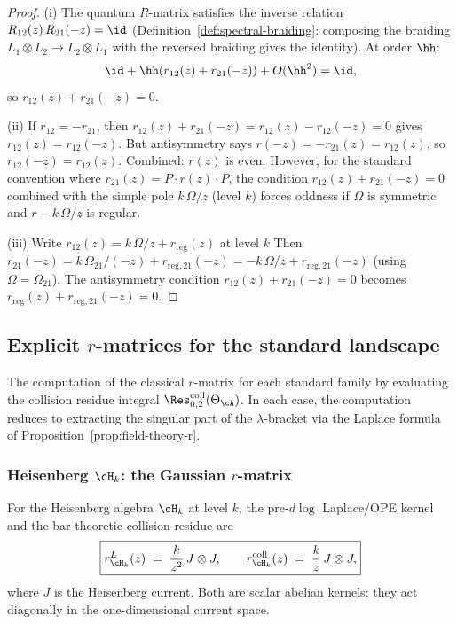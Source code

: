 \begin{proof}
(i) The quantum $R$-matrix satisfies the inverse relation
$R_{12}(z)\, R_{21}(-z) = \id$ (Definition~\ref{def:spectral-braiding}:
composing the braiding $L_1 \otimes L_2 \to L_2 \otimes L_1$
with the reversed braiding gives the identity). At order $\hh$:
\[
\id + \hh(r_{12}(z) + r_{21}(-z)) + O(\hh^2) = \id,
\]
so $r_{12}(z) + r_{21}(-z) = 0$.

(ii) If $r_{12} = -r_{21}$, then
$r_{12}(z) + r_{21}(-z) = r_{12}(z) - r_{12}(-z) = 0$ gives
$r_{12}(z) = r_{12}(-z)$. But antisymmetry says $r(-z) = -r_{21}(z)
= r_{12}(z)$, so $r_{12}(-z) = r_{12}(z)$. Combined: $r(z)$ is
even. However, for the standard convention where
$r_{21}(z) = P \cdot r(z) \cdot P$, the condition
$r_{12}(z) + r_{21}(-z) = 0$ combined with the simple pole
$k\,\Omega/z$ (level $k$) forces oddness if $\Omega$ is symmetric and
$r - k\,\Omega/z$ is regular.

(iii) Write $r_{12}(z) = k\,\Omega/z + r_{\mathrm{reg}}(z)$
at level $k$ Then $r_{21}(-z) = k\,\Omega_{21}/(-z) + r_{\mathrm{reg},21}(-z)
= -k\,\Omega/z + r_{\mathrm{reg},21}(-z)$ (using
$\Omega = \Omega_{21}$). The antisymmetry condition
$r_{12}(z) + r_{21}(-z) = 0$ becomes
$r_{\mathrm{reg}}(z) + r_{\mathrm{reg},21}(-z) = 0$.
\end{proof}

\subsection{Explicit $r$-matrices for the standard landscape}

The computation of the classical $r$-matrix for each standard family by
evaluating the collision residue integral
$\Res^{\mathrm{coll}}_{0,2}(\Theta_\cA)$. In each case, the
computation reduces to extracting the singular part of the
$\lambda$-bracket via the Laplace formula of
Proposition~\ref{prop:field-theory-r}.

\subsubsection{Heisenberg $\cH_k$: the Gaussian $r$-matrix}

\begin{proposition}
For the Heisenberg algebra $\cH_k$ at level $k$, the pre-\textup{\(d\log\)}
Laplace/OPE kernel and the bar-theoretic collision residue are
\begin{equation}
\boxed{
r^L_{\cH_k}(z) \;=\; \frac{k}{z^2}\, J \otimes J,
\qquad
r^{\mathrm{coll}}_{\cH_k}(z) \;=\; \frac{k}{z}\, J \otimes J,
}
\end{equation}
where $J$ is the Heisenberg current. Both are scalar abelian kernels:
they act diagonally in the one-dimensional current space.
\end{proposition}


